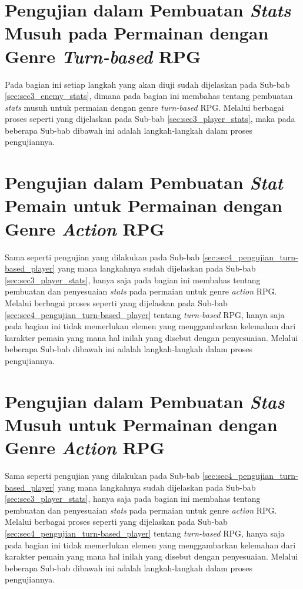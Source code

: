 \section{Pengujian dalam Pembuatan \textit{Stats} Musuh pada Permainan dengan Genre \textit{Turn-based} RPG}
\label{sec:sec4_pengujian_turn-based_enemy}
\vspace{1ex}

Pada bagian ini setiap langkah yang akan diuji sudah dijelaskan pada Sub-bab \ref{sec:sec3_enemy_stats}, dimana pada bagian ini membahas tentang pembuatan \textit{stats} musuh untuk permaian dengan genre \textit{turn-based} RPG. Melalui berbagai proses seperti yang dijelaskan pada Sub-bab \ref{sec:sec3_player_stats}, maka pada beberapa Sub-bab dibawah ini adalah langkah-langkah dalam proses pengujiannya.
\vspace{1ex}

\section{Pengujian dalam Pembuatan \textit{Stat} Pemain untuk Permainan dengan Genre \textit{Action} RPG}
\label{sec:sec4_pengujian_player}
\vspace{1ex}

Sama seperti pengujian yang dilakukan pada Sub-bab \ref{sec:sec4_pengujian_turn-based_player} yang mana langkahnya sudah dijelaskan pada Sub-bab \ref{sec:sec3_player_stats}, hanya saja pada bagian ini membahas tentang pembuatan dan penyesuaian \textit{stats} pada permaian untuk genre \textit{action} RPG. Melalui berbagai proses seperti yang dijelaskan pada Sub-bab \ref{sec:sec4_pengujian_turn-based_player} tentang \textit{turn-based} RPG, hanya saja pada bagian ini tidak memerlukan elemen yang menggambarkan kelemahan dari karakter pemain yang mana hal inilah yang disebut dengan penyesuaian. Melalui beberapa Sub-bab dibawah ini adalah langkah-langkah dalam proses pengujiannya.
\vspace{1ex}

\section{Pengujian dalam Pembuatan \textit{Stas} Musuh untuk Permainan dengan Genre \textit{Action} RPG}
\label{sec:sec4_pengujian_enemy}
\vspace{1ex}

Sama seperti pengujian yang dilakukan pada Sub-bab \ref{sec:sec4_pengujian_turn-based_player} yang mana langkahnya sudah dijelaskan pada Sub-bab \ref{sec:sec3_player_stats}, hanya saja pada bagian ini membahas tentang pembuatan dan penyesuaian \textit{stats} pada permaian untuk genre \textit{action} RPG. Melalui berbagai proses seperti yang dijelaskan pada Sub-bab \ref{sec:sec4_pengujian_turn-based_player} tentang \textit{turn-based} RPG, hanya saja pada bagian ini tidak memerlukan elemen yang menggambarkan kelemahan dari karakter pemain yang mana hal inilah yang disebut dengan penyesuaian. Melalui beberapa Sub-bab dibawah ini adalah langkah-langkah dalam proses pengujiannya.